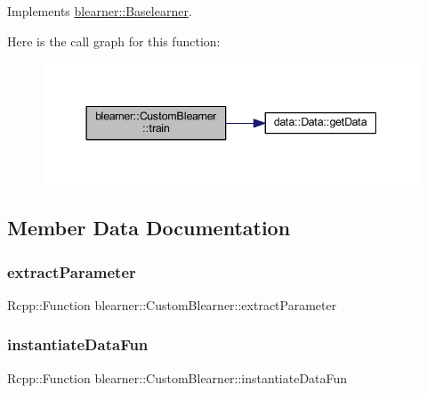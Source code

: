 Implements \mbox{\hyperlink{classblearner_1_1_baselearner_a40e03ad070b9a03aae706d9ee8094b80}{blearner\+::\+Baselearner}}.

Here is the call graph for this function\+:\nopagebreak
\begin{figure}[H]
\begin{center}
\leavevmode
\includegraphics[width=344pt]{classblearner_1_1_custom_blearner_a4726c5b861b67817f7b3eb61d8f6c0d7_cgraph}
\end{center}
\end{figure}


\subsection{Member Data Documentation}
\mbox{\label{classblearner_1_1_custom_blearner_a95a77720324a16190f84612ea0c0e812}} 
\subsubsection{\texorpdfstring{extract\+Parameter}{extractParameter}}
{\footnotesize\ttfamily Rcpp\+::\+Function blearner\+::\+Custom\+Blearner\+::extract\+Parameter\hspace{0.3cm}{\ttfamily [private]}}

\mbox{\label{classblearner_1_1_custom_blearner_a97bbb549bc85799ec40d3a67cb204222}} 
\subsubsection{\texorpdfstring{instantiate\+Data\+Fun}{instantiateDataFun}}
{\footnotesize\ttfamily Rcpp\+::\+Function blearner\+::\+Custom\+Blearner\+::instantiate\+Data\+Fun\hspace{0.3cm}{\ttfamily [private]}}

